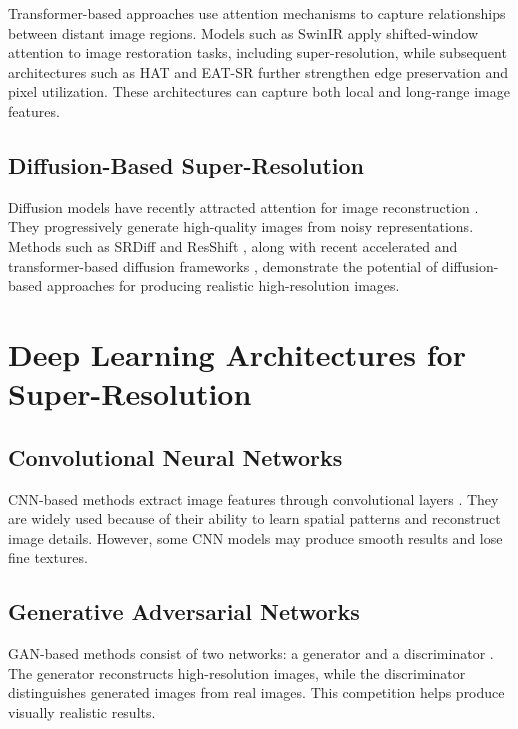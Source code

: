 \documentclass[conference]{IEEEtran}
\begin{document}
Transformer-based approaches use attention mechanisms to capture relationships between distant image regions. Models such as SwinIR \cite{liang2021swinir} apply shifted-window attention to image restoration tasks, including super-resolution, while subsequent architectures such as HAT \cite{chen2023hat} and EAT-SR \cite{goel2025eatsr} further strengthen edge preservation and pixel utilization. These architectures can capture both local and long-range image features.

\subsection{Diffusion-Based Super-Resolution}

Diffusion models have recently attracted attention for image reconstruction \cite{aala2026diffusion}. They progressively generate high-quality images from noisy representations. Methods such as SRDiff \cite{li2022srdiff} and ResShift \cite{yue2023resshift}, along with recent accelerated and transformer-based diffusion frameworks \cite{niu2024acdmsr, cheng2024ditsr, liu2024cdformer}, demonstrate the potential of diffusion-based approaches for producing realistic high-resolution images.

\section{Deep Learning Architectures for Super-Resolution}

\subsection{Convolutional Neural Networks}

CNN-based methods extract image features through convolutional layers \cite{dong2015srcnn, kim2016vdsr, lim2017edsr}. They are widely used because of their ability to learn spatial patterns and reconstruct image details. However, some CNN models may produce smooth results and lose fine textures.

\subsection{Generative Adversarial Networks}

GAN-based methods consist of two networks: a generator and a discriminator \cite{ledig2017srgan, wang2018esrgan}. The generator reconstructs high-resolution images, while the discriminator distinguishes generated images from real images. This competition helps produce visually realistic results.
\end{document}
